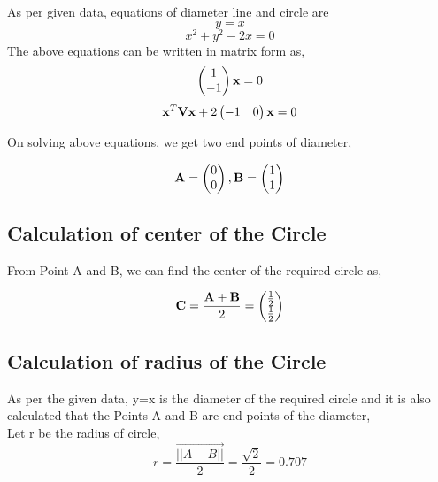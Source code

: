 \documentclass[journal,10pt,twocolumn]{article}
\begin{document}
\begin{flushleft}

As per given data, equations of diameter line and circle  are
\begin{equation}
y=x 
\end{equation}
\begin{equation}
x^2+y^2-2x=0
\end{equation}
The above equations can be written in matrix form as,
\begin{equation}
    \begin{pmatrix} 1\\-1\end{pmatrix} \mathbf{x} = 0
\end{equation}
\begin{equation}
   \mathbf{x}^T \mathbf{V} \mathbf{x} + 2 \begin{pmatrix}-1 & 0\end{pmatrix} \mathbf{x}=0
\end{equation}

\begin{flushleft}
On solving above equations, we get two end points of diameter,
\end{flushleft}
\begin{equation}
    \mathbf{A}=\begin{pmatrix} 0 \\ 0\end{pmatrix} , \mathbf{B}=\begin{pmatrix}1 \\ 1\end{pmatrix} 
\end{equation}
\subsection{Calculation of center of the Circle}
\begin{flushleft}
From Point A and B, we can find the center of the required circle as,\\
\end{flushleft}
\begin{equation}
\mathbf{C}=\frac{\mathbf{A+B}}{2} = \begin{pmatrix}\frac{1}{2}\\\frac{1}{2}\end{pmatrix}    
\end{equation}
\end{flushleft}

\subsection{Calculation of radius of the Circle}
As per the given data, y=x is the diameter of the required circle and it is also calculated that the Points A and B are end points of the diameter,\\
Let r be the radius of circle,\\
\begin{equation}
r= \frac{\vec{||A-B||}}{2} = \frac{\sqrt{2}}{2}=0.707
\end{equation}
\end{document}
